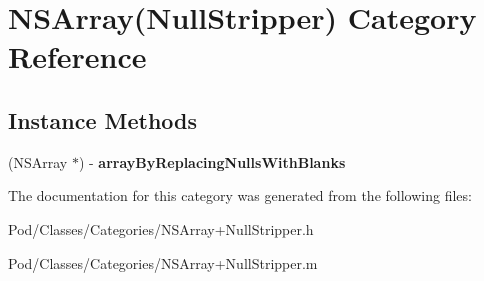 \hypertarget{category_n_s_array_07_null_stripper_08}{}\section{N\+S\+Array(Null\+Stripper) Category Reference}
\label{category_n_s_array_07_null_stripper_08}
\subsection*{Instance Methods}
\begin{DoxyCompactItemize}
\item 
(N\+S\+Array $\ast$) -\/ {\bfseries array\+By\+Replacing\+Nulls\+With\+Blanks}\hypertarget{category_n_s_array_07_null_stripper_08_a5e9a9528c57629c07901ed53e60ad90e}{}\label{category_n_s_array_07_null_stripper_08_a5e9a9528c57629c07901ed53e60ad90e}

\end{DoxyCompactItemize}


The documentation for this category was generated from the following files\+:\begin{DoxyCompactItemize}
\item 
Pod/\+Classes/\+Categories/N\+S\+Array+\+Null\+Stripper.\+h\item 
Pod/\+Classes/\+Categories/N\+S\+Array+\+Null\+Stripper.\+m\end{DoxyCompactItemize}
